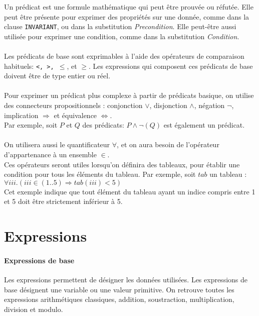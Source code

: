 Un prédicat est une formule mathématique qui peut être prouvée ou
réfutée. Elle peut être présente pour exprimer des propriétés sur une
donnée, comme dans la clause \texttt{INVARIANT}, ou dans la substitution
\emph{Precondition}. Elle peut-être aussi utilisée pour exprimer une
condition, comme dans la substitution \emph{Condition}.

\paragraph{}
Les prédicats de base sont exprimables à l'aide des opérateurs de
comparaison habituels: \texttt{<, >, $\leq$}, et \texttt{$\geq$}. Les
expressions qui composent ces prédicats de base doivent
être de type entier ou réel.

\paragraph{}
Pour exprimer un prédicat plus complexe à partir de prédicats basique,
on utilise des connecteurs propositionnels : conjonction \texttt{$\vee$},
disjonction \texttt{$\wedge$}, négation \texttt{$\neg$}, implication
\texttt{$\Rightarrow$} et équivalence \texttt{$\Leftrightarrow$}.\\
Par exemple, soit $P$ et $Q$ des prédicats: $P\wedge\neg(Q)$ est
également un prédicat.

\paragraph{}
On utilisera aussi le quantificateur $\forall$, et on aura besoin de
l'opérateur d'appartenance à un ensemble $\in$.\\  
Ces opérateurs seront utiles lorsqu'on
définira des tableaux, pour établir une condition pour tous les
éléments du tableau.
Par exemple, soit $tab$ un tableau : $\forall iii . (iii \in (1..5)
\Rightarrow tab(iii) < 5)$\\
Cet exemple indique que tout élément du tableau ayant un indice compris
entre 1 et 5 doit être strictement inférieur à 5. 



\section{Expressions}

\paragraph{Expressions de base}
Les expressions permettent de désigner les données utilisées. Les
expressions de base désignent une variable ou une valeur primitive.
On retrouve toutes les expressions arithmétiques classiques, addition,
soustraction, multiplication, division et modulo.

